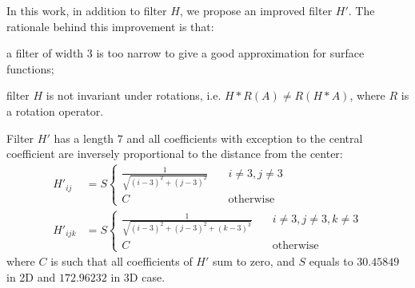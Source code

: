 \documentclass[reprint,amsmath,amssymb,aps,pre,showkeys,showpacs]{revtex4-1}
\begin{document}
In this work, in addition to filter $H$, we propose an improved filter $H'$. The rationale
behind this improvement is that:
\begin{enumerate*}[label=\alph*)]
\item a filter of width 3 is too narrow to give a good approximation for surface
  functions;
\item filter $H$ is not invariant under rotations, i.e.
  $H*R(A) \ne R(H*A)$, where $R$ is a rotation operator.
\end{enumerate*}
Filter $H'$ has a length $7$ and all coefficients with exception to the central
coefficient are inversely proportional to the distance from the center:
\begin{equation}
  \begin{aligned}
    H'_{ij} &= S \left\{
    \begin{array}{cc}
      \frac{1}{\sqrt{(i-3)^2 + (j-3)^2}} & \quad i \ne 3, j \ne 3 \\
      C & \quad \text{otherwise}
    \end{array}
    \right. \\
    H'_{ijk} &= S \left\{
    \begin{array}{cc}
      \frac{1}{\sqrt{(i-3)^2 + (j-3)^2 + (k-3)^3}} & \quad i \ne 3, j \ne 3, k
      \ne 3 \\
      C & \quad \text{otherwise}
    \end{array}
    \right.
  \end{aligned}
  \label{eq:filter-7x7}
\end{equation}
where $C$ is such that all coefficients of $H'$ sum to zero, and $S$ equals to
$30.45849$ in 2D and $172.96232$ in 3D case.
\end{document}
